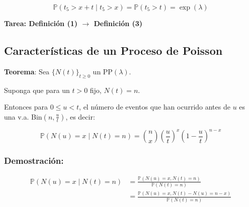 \documentclass[12pt]{article}
\begin{document}
\begin{equation*}
\mathbb{P}(t_5 > x+t \mid t_5 > x) = \mathbb{P}(t_5 > t) = \exp(\lambda)
\end{equation*}

\textbf{Tarea: Definición (1) $\longrightarrow$ Definición (3)}

\subsection*{Características de un Proceso de Poisson}

\textbf{Teorema}: Sea $\{N(t)\}_{t \geq 0}$ un PP$(\lambda)$.

Suponga que para un $t > 0$ fijo, $N(t) = n$.

Entonces para $0 \leq u < t$, el número de eventos que han ocurrido antes de $u$ es una v.a. Bin$(n, \frac{u}{t})$, es decir:

\begin{equation*}
\mathbb{P}(N(u) = x \mid N(t) = n) = \binom{n}{x} \left(\frac{u}{t}\right)^x \left(1 - \frac{u}{t}\right)^{n-x}
\end{equation*}

\subsubsection*{Demostración:}

\begin{center}
\end{center}

\begin{align*}
\mathbb{P}(N(u) = x \mid N(t) = n) &= \frac{\mathbb{P}(N(u) = x, N(t) = n)}{\mathbb{P}(N(t) = n)} \\
&= \frac{\mathbb{P}(N(u) = x, N(t) - N(u) = n - x)}{\mathbb{P}(N(t) = n)}
\end{align*}
\end{document}
